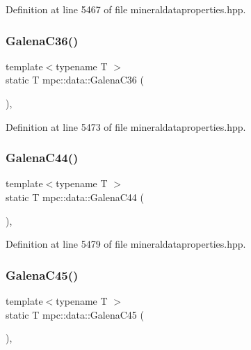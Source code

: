 Definition at line 5467 of file mineraldataproperties.\+hpp.

\mbox{\label{namespacempc_1_1data_abc226d0d6832eb3e1ff68695afc2424d}} 
\subsubsection{\texorpdfstring{Galena\+C36()}{GalenaC36()}}
{\footnotesize\ttfamily template$<$typename T $>$ \\
static T mpc\+::data\+::\+Galena\+C36 (\begin{DoxyParamCaption}{ }\end{DoxyParamCaption})\hspace{0.3cm}{\ttfamily [inline]}, {\ttfamily [static]}}



Definition at line 5473 of file mineraldataproperties.\+hpp.

\mbox{\label{namespacempc_1_1data_a45f2b7c29979ab9ca71bd14b48a7e513}} 
\subsubsection{\texorpdfstring{Galena\+C44()}{GalenaC44()}}
{\footnotesize\ttfamily template$<$typename T $>$ \\
static T mpc\+::data\+::\+Galena\+C44 (\begin{DoxyParamCaption}{ }\end{DoxyParamCaption})\hspace{0.3cm}{\ttfamily [inline]}, {\ttfamily [static]}}



Definition at line 5479 of file mineraldataproperties.\+hpp.

\mbox{\label{namespacempc_1_1data_af18bcfee2a34ea14f5128e6afc9f6853}} 
\subsubsection{\texorpdfstring{Galena\+C45()}{GalenaC45()}}
{\footnotesize\ttfamily template$<$typename T $>$ \\
static T mpc\+::data\+::\+Galena\+C45 (\begin{DoxyParamCaption}{ }\end{DoxyParamCaption})\hspace{0.3cm}{\ttfamily [inline]}, {\ttfamily [static]}}



